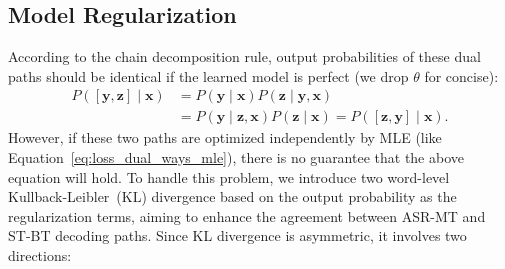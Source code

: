 \documentclass[letterpaper]{article} %
\begin{document}
\subsection*{Model Regularization}
According to the chain decomposition rule, output probabilities of these dual paths should be identical if the learned model is perfect (we drop $\theta$ for concise):
  \begin{equation}
        \begin{aligned}
            P\left([\mathbf{y},\mathbf{z}]\mid \mathbf{x}\right) & =  P\left( \mathbf{y} \mid \mathbf{x}\right) P\left( \mathbf{z} \mid \mathbf{y}, \mathbf{x}\right) \\
            & = P\left( \mathbf{y} \mid \mathbf{z}, \mathbf{x} \right) P\left( \mathbf{z} \mid \mathbf{x} \right) = P\left([\mathbf{z},\mathbf{y}] \mid \mathbf{x} \right).
        \end{aligned}
        \label{eq:agreement}
    \end{equation}
However, if these two paths are optimized independently by MLE (like Equation~\ref{eq:loss_dual_ways_mle}), there is no guarantee that the above equation will hold.
To handle this problem, we introduce two word-level Kullback-Leibler~(KL) divergence based on the output probability as the regularization terms, aiming to enhance the agreement between ASR-MT and ST-BT decoding paths.
Since KL divergence is asymmetric, it involves two directions:
\end{document}
